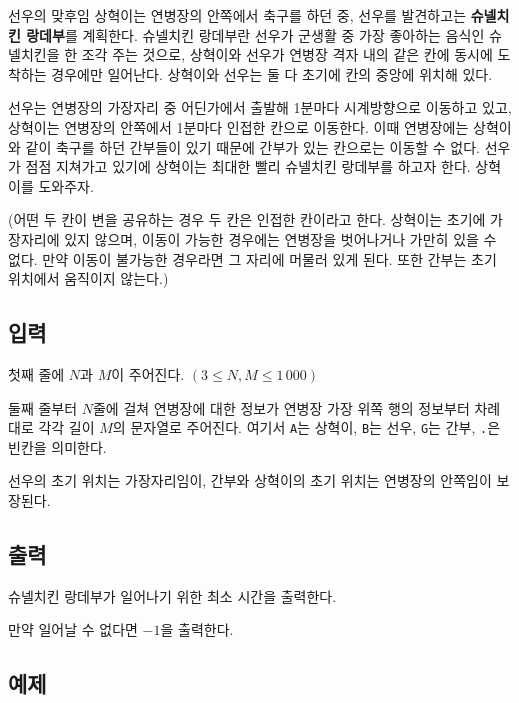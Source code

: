 선우의 맞후임 상혁이는 연병장의 안쪽에서 축구를 하던 중, 선우를 발견하고는 \textbf{슈넬치킨 랑데부}를 계획한다. 슈넬치킨 랑데부란 선우가 군생활 중 가장 좋아하는 음식인 슈넬치킨을 한 조각 주는 것으로, 상혁이와 선우가 연병장 격자 내의 같은 칸에 동시에 도착하는 경우에만 일어난다. 상혁이와 선우는 둘 다 초기에 칸의 중앙에 위치해 있다.

선우는 연병장의 가장자리 중 어딘가에서 출발해 1분마다 시계방향으로 이동하고 있고, 상혁이는 연병장의 안쪽에서 1분마다 인접한 칸으로 이동한다. 이때 연병장에는 상혁이와 같이 축구를 하던 간부들이 있기 때문에 간부가 있는 칸으로는 이동할 수 없다. 선우가 점점 지쳐가고 있기에 상혁이는 최대한 빨리 슈넬치킨 랑데부를 하고자 한다. 상혁이를 도와주자.

(어떤 두 칸이 변을 공유하는 경우 두 칸은 인접한 칸이라고 한다. 상혁이는 초기에 가장자리에 있지 않으며, 이동이 가능한 경우에는 연병장을 벗어나거나 가만히 있을 수 없다. 만약 이동이 불가능한 경우라면 그 자리에 머물러 있게 된다. 또한 간부는 초기 위치에서 움직이지 않는다.)

\newpage

\subsection*{입력}

첫째 줄에 $N$과 $M$이 주어진다. $(3\leq N,M\leq 1\,000)$

둘째 줄부터 $N$줄에 걸쳐 연병장에 대한 정보가 연병장 가장 위쪽 행의 정보부터 차례대로 각각 길이 $M$의 문자열로 주어진다.
여기서 \texttt{\color{red}A}는 상혁이, \texttt{\color{red}B}는 선우, \texttt{\color{red}G}는 간부, \texttt{\color{red}.}은 빈칸을 의미한다.

선우의 초기 위치는 가장자리임이, 간부와 상혁이의 초기 위치는 연병장의 안쪽임이 보장된다.

\subsection*{출력}

슈넬치킨 랑데부가 일어나기 위한 최소 시간을 출력한다.

만약 일어날 수 없다면 $-1$을 출력한다.

\subsection*{예제}

